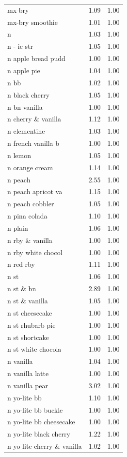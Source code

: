 \begin{table}
\begin{tabular}{lrr}
mx-bry & 1.09 & 1.00 \\
mx-bry smoothie & 1.01 & 1.00 \\
n & 1.03 & 1.00 \\
n - ic str & 1.05 & 1.00 \\
n apple bread pudd & 1.00 & 1.00 \\
n apple pie & 1.04 & 1.00 \\
n bb & 1.02 & 1.00 \\
n black cherry & 1.05 & 1.00 \\
n bn vanilla & 1.00 & 1.00 \\
n cherry \& vanilla & 1.12 & 1.00 \\
n clementine & 1.03 & 1.00 \\
n french vanilla b & 1.00 & 1.00 \\
n lemon & 1.05 & 1.00 \\
n orange cream & 1.14 & 1.00 \\
n peach & 2.55 & 1.00 \\
n peach apricot va & 1.15 & 1.00 \\
n peach cobbler & 1.05 & 1.00 \\
n pina colada & 1.10 & 1.00 \\
n plain & 1.06 & 1.00 \\
n rby \& vanilla & 1.00 & 1.00 \\
n rby white chocol & 1.00 & 1.00 \\
n red rby & 1.11 & 1.00 \\
n st & 1.06 & 1.00 \\
n st \& bn & 2.89 & 1.00 \\
n st \& vanilla & 1.05 & 1.00 \\
n st cheesecake & 1.00 & 1.00 \\
n st rhubarb pie & 1.00 & 1.00 \\
n st shortcake & 1.00 & 1.00 \\
n st white chocola & 1.00 & 1.00 \\
n vanilla & 1.04 & 1.00 \\
n vanilla latte & 1.00 & 1.00 \\
n vanilla pear & 3.02 & 1.00 \\
n yo-lite bb & 1.10 & 1.00 \\
n yo-lite bb buckle & 1.00 & 1.00 \\
n yo-lite bb cheesecake & 1.00 & 1.00 \\
n yo-lite black cherry & 1.22 & 1.00 \\
n yo-lite cherry \& vanilla & 1.02 & 1.00 \\

\end{tabular}
\end{table}

